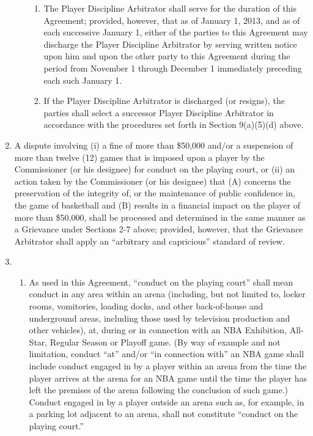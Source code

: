 \documentclass[
]{book}
\providecommand{\tightlist}{%
  \setlength{\itemsep}{0pt}\setlength{\parskip}{0pt}}
\begin{document}
\begin{enumerate}
\begin{enumerate}
\begin{enumerate}
    \item
      The Player Discipline Arbitrator shall serve for the duration of this Agreement; provided, however, that as of January 1, 2013, and as of each successive January 1, either of the parties to this Agreement may discharge the Player Discipline Arbitrator by serving written notice upon him and upon the other party to this Agreement during the period from November 1 through December 1 immediately preceding each such January 1.
    \item
      If the Player Discipline Arbitrator is discharged (or resigns), the parties shall select a successor Player Discipline Arbitrator in accordance with the procedures set forth in Section 9(a)(5)(d) above.
    \end{enumerate}
  \end{enumerate}
\item
  A dispute involving (i) a fine of more than \$50,000 and/or a suspension of more than twelve (12) games that is imposed upon a player by the Commissioner (or his designee) for conduct on the playing court, or (ii) an action taken by the Commissioner (or his designee) that (A) concerns the preservation of the integrity of, or the maintenance of public confidence in, the game of basketball and (B) results in a financial impact on the player of more than \$50,000, shall be processed and determined in the same manner as a Grievance under Sections 2-7 above; provided, however, that the Grievance Arbitrator shall apply an ``arbitrary and capricious'' standard of review.
\item
  \begin{enumerate}
  \def\labelenumii{(\roman{enumii})}
  \tightlist
  \item
    As used in this Agreement, ``conduct on the playing court'' shall mean conduct in any area within an arena (including, but not limited to, locker rooms, vomitories, loading docks, and other back-of-house and underground areas, including those used by television production and other vehicles), at, during or in connection with an NBA Exhibition, All-Star, Regular Season or Playoff game. (By way of example and not limitation, conduct ``at'' and/or ``in connection with'' an NBA game shall include conduct engaged in by a player within an arena from the time the player arrives at the arena for an NBA game until the time the player has left the premises of the arena following the conclusion of such game.) Conduct engaged in by a player outside an arena such as, for example, in a parking lot adjacent to an arena, shall not constitute ``conduct on the playing court.''

\end{enumerate}
\end{enumerate}
\end{document}
